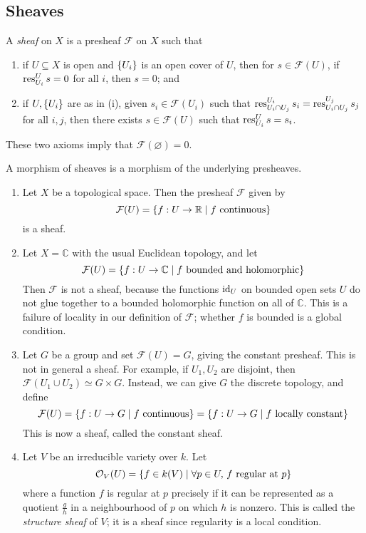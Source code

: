 \subsection{Sheaves}
\begin{definition}
    A \emph{sheaf} on \( X \) is a presheaf \( \mathcal F \) on \( X \) such that
    \begin{enumerate}
        \item if \( U \subseteq X \) is open and \( \qty{U_i} \) is an open cover of \( U \), then for \( s \in \mathcal F(U) \), if \( \operatorname{res}_{U_i}^U s = 0 \) for all \( i \), then \( s = 0 \); and
        \item if \( U, \qty{U_i} \) are as in (i), given \( s_i \in \mathcal F(U_i) \) such that \( \operatorname{res}^{U_i}_{U_i \cap U_j} s_i = \operatorname{res}^{U_j}_{U_i \cap U_j} s_j \) for all \( i, j \), then there exists \( s \in \mathcal F(U) \) such that \( \operatorname{res}^U_{U_i} s = s_i \).
    \end{enumerate}
\end{definition}
\begin{remark}
    These two axioms imply that \( \mathcal F(\varnothing) = 0 \).
\end{remark}
A morphism of sheaves is a morphism of the underlying presheaves.
\begin{example}
    \begin{enumerate}
        \item Let \( X \) be a topological space.
        Then the presheaf \( \mathcal F \) given by
        \[ \mathcal F(U) = \qty{f : U \to \mathbb R \mid f \text{ continuous}} \]
        is a sheaf.
        \item Let \( X = \mathbb C \) with the usual Euclidean topology, and let
        \[ \mathcal F(U) = \qty{f : U \to \mathbb C \mid f \text{ bounded and holomorphic}} \]
        Then \( \mathcal F \) is not a sheaf, because the functions \( \operatorname{id}_U \) on bounded open sets \( U \) do not glue together to a bounded holomorphic function on all of \( \mathbb C \).
        This is a failure of locality in our definition of \( \mathcal F \); whether \( f \) is bounded is a global condition.
        \item Let \( G \) be a group and set \( \mathcal F(U) = G \), giving the constant presheaf.
        This is not in general a sheaf.
        For example, if \( U_1, U_2 \) are disjoint, then \( \mathcal F(U_1 \cup U_2) \simeq G \times G \).
        Instead, we can give \( G \) the discrete topology, and define
        \[ \mathcal F(U) = \qty{f : U \to G \mid f \text{ continuous}} = \qty{f : U \to G \mid f \text{ locally constant}} \]
        This is now a sheaf, called the constant sheaf.
        \item Let \( V \) be an irreducible variety over \( k \).
        Let
        \[ \mathcal O_V(U) = \qty{f \in k(V) \mid \forall p \in U,\, f \text{ regular at } p} \]
        where a function \( f \) is regular at \( p \) precisely if it can be represented as a quotient \( \frac{g}{h} \) in a neighbourhood of \( p \) on which \( h \) is nonzero.
        This is called the \emph{structure sheaf} of \( V \); it is a sheaf since regularity is a local condition.
    \end{enumerate}
\end{example}

